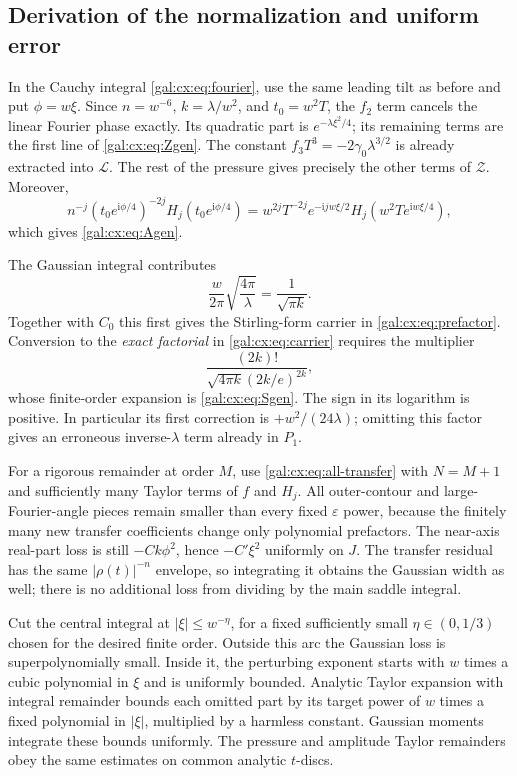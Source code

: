 \documentclass[11pt,letterpaper]{article}
\numberwithin{equation}{section}
\theoremstyle{definition}\newtheorem{definition}[theorem]{Definition}
\theoremstyle{remark}\newtheorem{remark}[theorem]{Remark}
\newcommand{\ii}{\mathrm i}
\newcommand{\eps}{\varepsilon}
\begin{document}
\subsection{Derivation of the normalization and uniform error}
In the Cauchy integral \eqref{gal:cx:eq:fourier}, use the same leading tilt as before and put $\phi=w\xi$. Since $n=w^{-6}$, $k=\lambda/w^2$, and $t_0=w^2T$, the $f_2$ term cancels the linear Fourier phase exactly. Its quadratic part is $e^{-\lambda\xi^2/4}$; its remaining terms are the first line of \eqref{gal:cx:eq:Zgen}. The constant
$f_3T^3=-2\gamma_0\lambda^{3/2}$ is already extracted into $\mathcal L$. The rest of the pressure gives precisely the other terms of $\mathcal Z$. Moreover,
\[
n^{-j}(t_0e^{\ii\phi/4})^{-2j}
H_j(t_0e^{\ii\phi/4})
=w^{2j}T^{-2j}e^{-\ii jw\xi/2}
H_j(w^2T e^{\ii w\xi/4}),
\]
which gives \eqref{gal:cx:eq:Agen}.

The Gaussian integral contributes
\[
\frac{w}{2\pi}\sqrt{\frac{4\pi}{\lambda}}
=\frac1{\sqrt{\pi k}}.
\]
Together with $C_0$ this first gives the Stirling-form carrier in \eqref{gal:cx:eq:prefactor}. Conversion to the \emph{exact factorial} in \eqref{gal:cx:eq:carrier} requires the multiplier
\begin{equation}\label{gal:cx:eq:stirling-factor}
\frac{(2k)!}{\sqrt{4\pi k}(2k/e)^{2k}},
\end{equation}
whose finite-order expansion is \eqref{gal:cx:eq:Sgen}. The sign in its logarithm is positive. In particular its first correction is $+w^2/(24\lambda)$; omitting this factor gives an erroneous inverse-$\lambda$ term already in $P_1$.

For a rigorous remainder at order $M$, use \eqref{gal:cx:eq:all-transfer} with $N=M+1$ and sufficiently many Taylor terms of $f$ and $H_j$. All outer-contour and large-Fourier-angle pieces remain smaller than every fixed $\eps$ power, because the finitely many new transfer coefficients change only polynomial prefactors. The near-axis real-part loss is still $-Ck\phi^2$, hence $-C'\xi^2$ uniformly on $J$. The transfer residual has the same $|\rho(t)|^{-n}$ envelope, so integrating it obtains the Gaussian width as well; there is no additional loss from dividing by the main saddle integral.

Cut the central integral at $|\xi|\le w^{-\eta}$, for a fixed sufficiently small $\eta\in(0,1/3)$ chosen for the desired finite order. Outside this arc the Gaussian loss is superpolynomially small. Inside it, the perturbing exponent starts with $w$ times a cubic polynomial in $\xi$ and is uniformly bounded. Analytic Taylor expansion with integral remainder bounds each omitted part by its target power of $w$ times a fixed polynomial in $|\xi|$, multiplied by a harmless constant. Gaussian moments integrate these bounds uniformly. The pressure and amplitude Taylor remainders obey the same estimates on common analytic $t$-discs.
\end{document}
